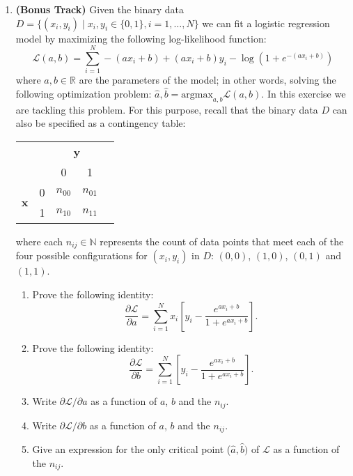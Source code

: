 \documentclass[]{book}
\theoremstyle{definition}
\newcommand{\bb}[1]{\mathbb{#1}}
\newcommand{\R}{\bb{R}}
\newcommand{\N}{\bb{N}}
\begin{document}
\begin{enumerate}
\item {\bf (Bonus Track)} Given the binary data $D = \{(x_i, y_i) \;|\; x_i, y_i\in\{0,1\}, i=1, \ldots, N\}$ we can fit 
a logistic regression model by maximizing the following log-likelihood function:
\[
\mathcal{L}(a, b) = \sum_{i=1}^N  -(ax_i + b) + (ax_i + b)y_i - \log(1 + e^{-(ax_i + b)})
\]
where $a, b\in\R$ are the parameters of the model; in other words, solving the following optimization problem:
\(
\hat{a}, \hat{b} = \textrm{argmax}_{a, b} \mathcal{L}(a, b).
\)
In this exercise we are tackling this problem. For this purpose, recall that the binary data $D$ can 
also be specified as a contingency table:
\begin{center}
\begin{tabular}{ll|c|c|c}
\cline{3-4}
                                         &   & \multicolumn{2}{c|}{\bf y} &  \\ \cline{3-4}
                                         &   & 0          & 1         &  \\ \cline{1-4}
\multicolumn{1}{|c|}{\multirow{2}{*}{\bf x}} & 0 & $n_{00}$  & $n_{01}$ &  \\ \cline{2-4}
\multicolumn{1}{|c|}{}                   & 1 & $n_{10}$  & $n_{11}$ &  \\ \cline{1-4}

\end{tabular}
\end{center}
where each $n_{ij}\in\N$ represents the count of data points that meet each of the four 
possible configurations for $(x_i, y_i)$ in $D$: $(0, 0)$, $(1, 0)$, $(0, 1)$ and $(1, 1)$.  

\begin{enumerate}
\item Prove the following identity: 
\[
\frac{\partial \mathcal{L}}{\partial a} = \sum_{i=1}^N x_i \left[y_i - \frac{e^{ax_i + b}}{1 + e^{ax_i + b}}\right].
\]
\item Prove the following identity:
\[
\frac{\partial \mathcal{L}}{\partial b} = \sum_{i=1}^N \left[y_i - \frac{e^{ax_i + b}}{1 + e^{ax_i + b}}\right].
\]
\item Write $\partial \mathcal{L}/\partial a$ as a function of $a$, $b$ and the $n_{ij}$.
\item Write $\partial \mathcal{L}/\partial b$ as a function of $a$, $b$ and the $n_{ij}$.
\item Give an expression for the only critical point ($\hat{a}, \hat{b})$ of $\mathcal{L}$ as a function of the $n_{ij}$.

\end{enumerate}



\end{enumerate}
\end{document}
